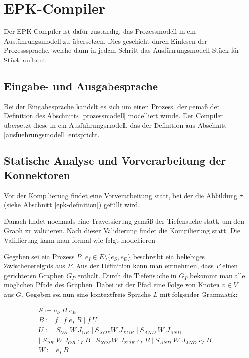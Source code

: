 \section{EPK-Compiler}
\label{epk-compiler}

Der EPK-Compiler ist dafür zuständig, das Prozessmodell in ein Ausführungsmodell zu übersetzen.
Dies geschieht durch Einlesen der Prozesssprache, welche dann in jedem Schritt das Ausführungsmodell Stück für Stück aufbaut.

\subsection{Eingabe- und Ausgabesprache}

Bei der Eingabesprache handelt es sich um einen Prozess, der gemäß der Definition des Abschnitts \ref{prozessmodell} modelliert wurde. 
Der Compiler übersetzt diese in ein Ausführungsmodell, das der Definition aus Abschnitt \ref{ausfuehrungsmodell} entspricht.

\subsection{Statische Analyse und Vorverarbeitung der Konnektoren}

Vor der Kompilierung findet eine Vorverarbeitung statt, bei der die Abbildung $\tau$ (siehe Abschnitt \ref{epk-definition}) gefüllt wird.

\noindent Danach findet nochmals eine Traversierung gemäß der Tiefensuche statt, um den Graph zu validieren. Nach dieser Validierung findet die Kompilierung statt. 
Die Validierung kann man formal wie folgt modellieren:

\noindent Gegeben sei ein Prozess $P$. $e_I \in E \setminus \{e_S, e_E\}$ beschreibt ein beliebiges Zwischenereignis aus $P$. Aus der Definition kann man entnehmen, dass $P$ einen gerichteten Graphen $G_P$ enthält. 
Durch die Tiefensuche in $G_P$ bekommt man alle möglichen Pfade des Graphen. Dabei ist der Pfad eine Folge von Knoten $v \in V$ aus $G$. Gegeben sei nun eine kontextfreie Sprache $L$ mit folgender Grammatik:

\begin{align}
    S := e_S \; B \; e_E \\
    B := f \; | \; f \; e_I \; B \; | \; f \; U \\
    U := \; S_{OR} \; W \; J_{OR} \; | \; S_{XOR} W \; J_{XOR} \; | \; S_{AND} \; W \; J_{AND} \; \\
    | \; S_{OR} \; W \; J_{OR} \; e_I \; B\; | \; S_{XOR} W \; J_{XOR} \; e_I \; B \; | \; S_{AND} \; W \; J_{AND} \; e_I \; B \; \\
    W := e_I \; B
\end{align}

